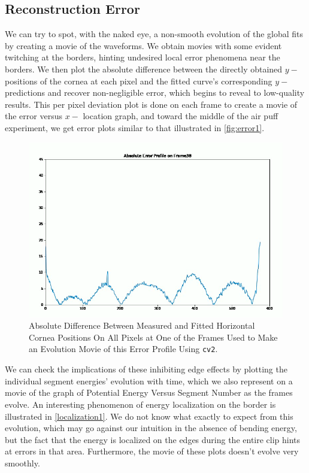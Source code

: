\documentclass[epjST]{svjour}
\begin{document}
\subsection{Reconstruction Error}
We can try to spot, with the naked eye, a non-smooth evolution of the global fits by creating a movie of the waveforms. We obtain movies with some evident twitching at the borders, hinting undesired local error phenomena near the borders. We then plot the absolute difference between the directly obtained $y-$ positions of the cornea at each pixel and the fitted curve's corresponding $y-$ predictions and recover non-negligible error, which begins to reveal to low-quality results. This per pixel deviation plot is done on each frame to create a movie of the error versus $x-$ location graph, and toward the middle of the air puff experiment, we get error plots similar to that illustrated in \autoref{fig:error1}.
\begin{figure}
    \centering
    \includegraphics[width=0.8\linewidth]{figures/minimization1/Screen Shot 2024-07-29 at 10.38.13 PM.png}
    \caption{Absolute Difference Between Measured and Fitted Horizontal Cornea Positions On All Pixels at One of the Frames Used to Make an Evolution Movie of this Error Profile Using \texttt{cv2}.}
    \label{fig:error1}
\end{figure}
We can check the implications of these inhibiting edge effects by plotting the individual segment energies' evolution with time, which we also represent on a movie of the graph of Potential Energy Versus Segment Number as the frames evolve. An interesting phenomenon of energy localization on the border is illustrated in \autoref{localization1}. We do not know what exactly to expect from this evolution, which may go against our intuition in the absence of bending energy, but the fact that the energy is localized on the edges during the entire clip hints at errors in that area. Furthermore, the movie of these plots doesn't evolve very smoothly.
\end{document}
